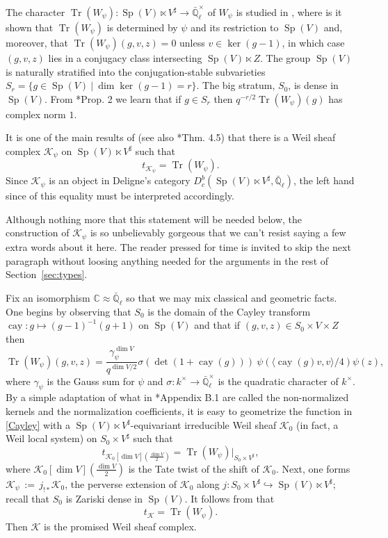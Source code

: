 \documentclass[10pt]{amsart}
\theoremstyle{plain}
\theoremstyle{definition}
\newcommand{\CC}{{\mathbb{C}}}
\newcommand{\EE}{\mathbb{\bar Q}_\ell}
\newcommand{\Fq}{k}
\DeclareMathOperator{\trace}{Tr}
\newcommand{\ceq}{{\, :=\, }}
\newcommand{\tq}{{\ \vert\ }}
\newcommand{\trFrob}[1]{t_{#1}}
\newcommand{\cs}[1]{{\mathcal{#1}}}
\newcommand{\Sp}{{\operatorname{Sp}}}
\newcommand{\cay}{{\operatorname{cay}}}
\begin{document}
The character $\trace(W_\psi) : \Sp(V)\ltimes V^\sharp \to \EE^\times$ of $W_\psi$ is studied in \cite{howe:73a}, where is it shown that $\trace(W_\psi)$ is determined by $\psi$ and its restriction to $\Sp(V)$ and, moreover, that $\trace(W_\psi)(g,v,z) =0$ unless $v\in \ker(g-1)$, in which case $(g,v,z)$ lies in a conjugacy class intersecting $\Sp(V) \ltimes Z$. 
%
The group $\Sp(V)$ is naturally stratified into the conjugation-stable subvarieties $S_r = \{ g\in \Sp(V) \tq \dim \ker (g-1) = r \}$. 
The big stratum, $S_0$, is dense in $\Sp(V)$.
 From \cite{howe:73a}*{Prop. 2} we learn that if $g\in S_r$ then $q^{-r/2} \trace(W_\psi)(g)$ has complex norm $1$.

It is one of the main results of \cite{gurevich-hadani:07a} (see also \cite{gurevich-hadani:11a}*{Thm. 4.5}) that there is a Weil sheaf complex $\cs{K}_{\psi}$ on $\Sp(V)\ltimes V^\sharp$ such that 
\begin{equation}
\trFrob{\cs{K}_\psi} = \trace(W_\psi).
\end{equation}
%
Since $\cs{K}_\psi$ is an object in Deligne's category $D^b_c(\Sp(V)\ltimes V^\sharp,\EE)$, the left hand since of this equality must be interpreted accordingly.

Although nothing more that this statement will be needed below, the construction of $\cs{K}_\psi$ is so unbelievably gorgeous that we can't resist saying a few extra words about it here.
The reader pressed for time is invited to skip the next paragraph without loosing anything needed for the arguments in the rest of Section~\ref{sec:types}.

Fix an isomorphism $\CC \approx \EE$ so that we may mix classical and geometric facts. 
One begins by observing that $S_0$ is the domain of the Cayley transform $\cay : g \mapsto (g-1)^{-1}(g+1)$ on $\Sp(V)$ and that if $(g,v,z) \in S_0\times V\times Z$ then
\begin{equation}\label{Cayley}
\trace(W_\psi)(g,v,z) =  \frac{\gamma_\psi^{\dim V}}{q^{\dim V/2} } \sigma(\det(1+\cay(g)))\ \psi\left(\langle \cay(g)v,v\rangle/4 \right) \psi(z),
\end{equation}
 where $\gamma_\psi$ is the Gauss sum for $\psi$ and $\sigma : \Fq^\times \to \EE^\times$ is the quadratic character of $\Fq^\times$.
By a simple adaptation of what in \cite{gurevich-hadani:07a}*{Appendix B.1} are called the non-normalized kernels and the normalization coefficients, it is easy to geometrize the function in \eqref{Cayley} with a $\Sp(V)\ltimes V^\sharp$-equivariant irreducible Weil sheaf $\cs{K}_0$ (in fact, a Weil local system) on $S_0 \times V^\sharp$ such that 
\[
\trFrob{\cs{K}_0[\dim V](\frac{\dim V}{2})} = \trace(W_\psi)\vert_{S_0\times V^\sharp},
\]
where $\cs{K}_0[\dim V](\frac{\dim V}{2})$ is the Tate twist of the shift of $\cs{K}_0$.
%
Next, one forms $\cs{K}_\psi \ceq j_{!*} \cs{K}_0$, the perverse extension of $\cs{K}_0$ along $j : S_0 \times V^\sharp \hookrightarrow \Sp(V) \ltimes V^\sharp$; recall that $S_0$ is Zariski dense in $\Sp(V)$. 
It follows from \cite{gurevich-hadani:07a} that 
\[
\trFrob{\cs{K}} = \trace(W_\psi).
\]
Then $\cs{K}$ is the promised Weil sheaf complex.
\end{document}
